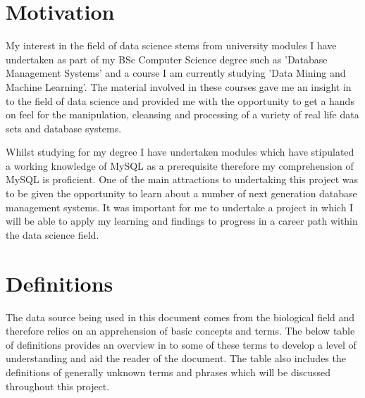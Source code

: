 \section{Motivation}
My interest in the field of data science stems from university modules I have undertaken as part of my BSc Computer Science degree such as 'Database Management Systems' and a course I am currently studying 'Data Mining and Machine Learning'. The material involved in these courses gave me an insight in to the field of data science and provided me with the opportunity to get a hands on feel for the manipulation, cleansing and processing of a variety of real life data sets and database systems.

Whilst studying for my degree I have undertaken modules which have stipulated a working knowledge of MySQL as a prerequisite therefore my comprehension of MySQL is proficient. One of the main attractions to undertaking this project was to be given the opportunity to learn about a number of next generation database management systems. It was important for me to undertake a project in which I will be able to apply my learning and findings to progress in a career path within the data science field.

\section{Definitions}
The data source being used in this document comes from the biological field and therefore relies on an apprehension of basic concepts and terms. The below table of definitions provides an overview in to some of these terms to develop a level of understanding and aid the reader of the document. The table also includes the definitions of generally unknown terms and phrases which will be discussed throughout this project.

